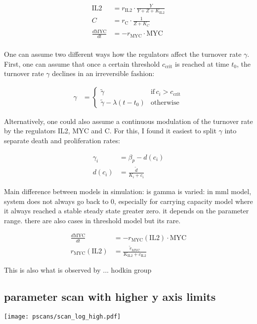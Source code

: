 \documentclass[12pt,a4paper]{article}
\begin{document}
\begin{align*}
\text{IL2} &= r_\text{IL2}\cdot \frac{Y}{Y+Z+K_\text{IL2}} \\
C &= r_\text{C}\cdot \frac{1}{Z+K_C} \\
\frac{d\text{MYC}}{dt} &= -r_\text{MYC} \cdot \text{MYC} \\
\end{align*}

One can assume two different ways how the regulators affect the turnover rate $\gamma$. First, one can assume that once a certain threshold $c_\text{crit}$ is reached at time $t_0$, the turnover rate $\gamma$ declines in an irreversible fashion:

\begin{align*}
\gamma &= \begin{cases}
\widetilde{\gamma} & \text{if}\, c_i > c_\text{crit} \\
\widetilde{\gamma} - \lambda (t-t_0)           & \text{otherwise}
\end{cases}
\end{align*}

Alternatively, one could also assume a continuous modulation of the turnover rate by the regulators IL2, MYC and C. For this, I found it easiest to split $\gamma $ into separate death and proliferation rates:

\begin{align*}
\gamma_i &= \beta_p-d(c_i)\\
d(c_i) &= \frac{\widetilde{d}}{K_i+c_i}
\end{align*}

Main difference between models in simulation: is gamma is varied: in mml model, system does not always go back to 0, especially for carrying capacity model where it always reached a stable steady state greater zero. it depends on the parameter range. there are also cases in threshold model but its rare.



\begin{align*}
\frac{d\text{MYC}}{dt} &= -r_\text{MYC}(\text{IL2}) \cdot \text{MYC} \\
r_\text{MYC}(\text{IL2}) &= \frac{\widetilde{r}_\text{MYC}}{K_\text{IL2}+c_\text{IL2}}
\end{align*}

This is also what is observed by ... hodkin group

\subsection*{parameter scan with higher y axis limits}
\texttt{[image: pscans/scan\_log\_high.pdf]}
\end{document}
